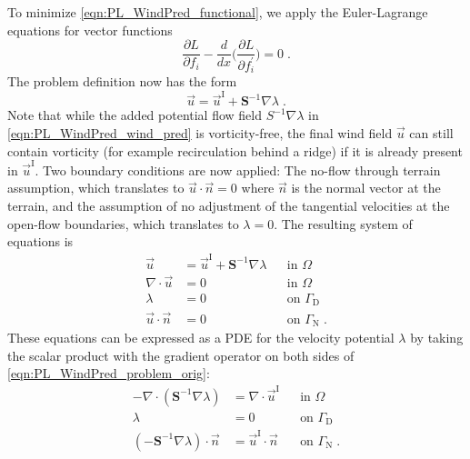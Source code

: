 \documentclass[twocolumn,letterpaper]{IEEEAerospaceCLS}
\def\pazocal#1{{#1}}
\newcommand{\matr}[1]{\bm{#1}}
\begin{document}
To minimize \cref{eqn:PL_WindPred_functional}, we apply the Euler-Lagrange equations for vector functions 
\begin{equation}
\frac{\partial\pazocal{L}}{\partial f_i}-\frac{d}{dx} \Big( \frac{\partial\pazocal{L}}{\partial f_i^\prime}\Big) = 0 \; .
\end{equation}
The problem definition now has the form 
\begin{equation}
	\vec{u} = \vec{u}^\text{I} + \matr{S}^{-1} \nabla \lambda \; .
	\label{eqn:PL_WindPred_wind_pred}
\end{equation}
Note that while the added potential flow field $S^{-1}\nabla\lambda$ in \cref{eqn:PL_WindPred_wind_pred} is vorticity-free, the final wind field $\vec{u}$ can still contain vorticity (for example recirculation behind a ridge) if it is already present in $\vec{u}^\text{I}$. Two boundary conditions are now applied: The no-flow through terrain assumption, which translates to $\vec{u}\cdot\vec{n}=0$ where $\vec{n}$ is the normal vector at the terrain, and the assumption of no adjustment of the tangential velocities at the open-flow boundaries, which translates to $\lambda=0$. The resulting system of equations is
	\begin{equation}
	\begin{aligned}
	\vec{u} &= \vec{u}^\text{I} + \matr{S}^{-1} \nabla \lambda && \text{in } \Omega \\
	\nabla \cdot \vec{u} &= 0 && \text{in } \Omega \\
	\lambda &= 0 && \text{on } \Gamma_\text{D} \\
	\vec{u} \cdot \vec{n} &= 0 && \text{on } \Gamma_\text{N} \; .
	\label{eqn:PL_WindPred_problem_orig}
	\end{aligned}
	\end{equation}
These equations can be expressed as a \ac{PDE} for the velocity potential $\lambda$ by taking the scalar product with the gradient operator on both sides of \cref{eqn:PL_WindPred_problem_orig}:
	\begin{equation}
	\begin{aligned}
	-\nabla \cdot \left(\matr{S}^{-1} \nabla \lambda\right) & = \nabla \cdot \vec{u}^\text{I} && \text{in } \Omega \\
	\lambda &= 0 && \text{on } \Gamma_\text{D} \\
	\left(-\matr{S}^{-1} \nabla \lambda\right) \cdot \vec{n} &= \vec{u}^\text{I} \cdot \vec{n} && \text{on } \Gamma_\text{N} \; .
	\label{eqn:PL_WindPred_problem_pdf}
	\end{aligned}
	\end{equation}
\end{document}
